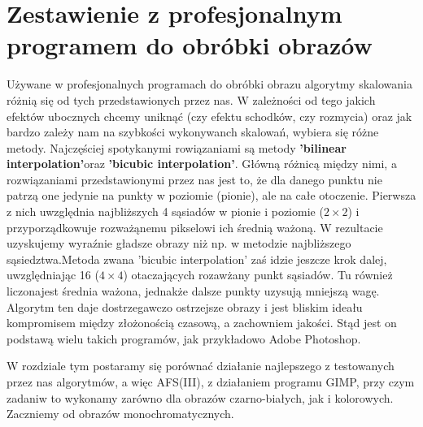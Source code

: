 \section{Zestawienie z profesjonalnym programem do obróbki obrazów}
Używane w profesjonalnych programach do obróbki obrazu algorytmy skalowania
różnią się od tych przedstawionych przez nas. W zależności od tego jakich
efektów ubocznych chcemy uniknąć (czy efektu schodków, czy rozmycia) oraz jak
bardzo zależy nam na szybkości wykonywanch skalowań, wybiera się różne metody.
Najczęściej spotykanymi rowiązaniami są metody
\textbf{'bilinear interpolation'}oraz \textbf{'bicubic interpolation'}.
Główną różnicą między nimi, a
rozwiązaniami przedstawionymi przez nas jest to, że dla danego punktu nie
patrzą one jedynie na punkty w poziomie (pionie), ale na całe otoczenie.
Pierwsza z nich uwzględnia najbliższych 4 sąsiadów w pionie i poziomie
($2\times2$) i przyporządkowuje rozważąnemu pikselowi ich średnią ważoną.
W rezultacie uzyskujemy wyraźnie gładsze obrazy niż np. w metodzie
najbliższego sąsiedztwa.Metoda zwana 'bicubic interpolation' zaś idzie jeszcze krok dalej, uwzględniając 16 ($4\times4$) otaczających rozawżany punkt sąsiadów. Tu również
liczonajest średnia ważona, jednakże dalsze punkty uzysują mniejszą wagę.
Algorytm ten daje dostrzegawczo ostrzejsze obrazy i jest bliskim ideału
kompromisem między złożonością czasową, a zachowniem jakości. Stąd jest on
podstawą wielu takich programów, jak przykładowo Adobe Photoshop.

W rozdziale tym postaramy się porównać działanie najlepszego z testowanych przez
nas algorytmów, a więc AFS(III), z działaniem programu GIMP, przy czym zadaniw to
wykonamy zarówno dla obrazów czarno-białych, jak i kolorowych. Zaczniemy od obrazów
monochromatycznych. 

